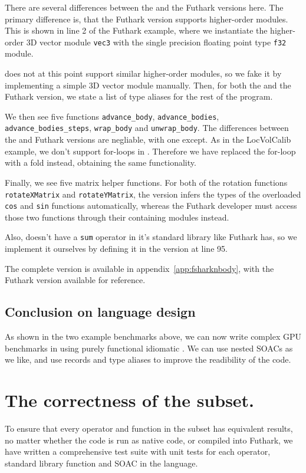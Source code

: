 There are several differences between the \fshark{} and the Futhark versions
here. The primary difference is, that the Futhark version supports higher-order
modules. This is shown in line 2 of the Futhark example, where we instantiate
the higher-order 3D vector module \texttt{vec3} with the single precision floating point
type \texttt{f32} module.

\fshark{} does not at this point support similar higher-order modules, so we
fake it by implementing a simple 3D vector module manually.
Then, for both the \fshark{} and the Futhark version, we state a list of type
aliases for the rest of the program.

We then see five functions \texttt{advance\_body}, \texttt{advance\_bodies},
\texttt{advance\_bodies\_steps}, \texttt{wrap\_body} and \texttt{unwrap\_body}.
The differences between the \fshark{} and Futhark versions are negliable, with
one except.
As in the LocVolCalib example, we don't support for-loops in \fshark{}.
Therefore we have replaced the for-loop with a fold instead, obtaining the same functionality. 

Finally, we see five matrix helper functions. For both of the rotation functions
\texttt{rotateXMatrix} and \texttt{rotateYMatrix}, the \fshark{} version infers
the types of the overloaded \texttt{cos} and \texttt{sin} functions
automatically, whereas the Futhark developer must access those two functions
through their containing modules instead.

Also, \fshark{} doesn't have a \texttt{sum} operator in it's standard library
like Futhark has, so we implement it ourselves by defining it in the \fshark{}
version at line 95.

The complete \fshark{} version is available in
appendix~\ref{app:fsharknbody}, with the Futhark version available for reference.

\subsection{Conclusion on \fshark{} language design}
As shown in the two example benchmarks above, we can now write complex GPU
benchmarks in \fsharp{} using purely functional idiomatic \fsharp{}.
We can use nested SOACs as we like, and use records and type aliases to improve
the readibility of the code.

\section{The correctness of the \fshark{} subset.}
\label{subsec:fsharkcorrectness}
To ensure that every operator and function in the \fshark{} subset has
equivalent results, no matter whether the \fshark{} code is run as native
\fsharp{} code, or compiled into Futhark, we have written a comprehensive test suite with unit
tests for each operator, standard library function and SOAC in the \fshark{}
language.

